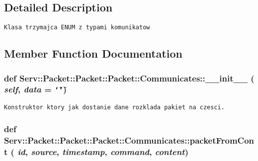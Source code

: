 \subsection{Detailed Description}


\footnotesize\begin{verbatim}Klasa trzymajca ENUM z typami komunikatow\end{verbatim}
\normalsize
 

\subsection{Member Function Documentation}
\hypertarget{class_serv_1_1_packet_1_1_packet_1_1_communicates_66ff7f1e5bb2594020af9e531007ce07}{
\subsubsection[{\_\-\_\-init\_\-\_\-}]{\setlength{\rightskip}{0pt plus 5cm}def Serv::Packet::Packet::Packet::Communicates::\_\-\_\-init\_\-\_\- ( {\em self}, \/   {\em data} = {\tt \char`\"{}\char`\"{}})}}
\label{class_serv_1_1_packet_1_1_packet_1_1_communicates_66ff7f1e5bb2594020af9e531007ce07}




\footnotesize\begin{verbatim}Konstruktor ktory jak dostanie dane rozklada pakiet na czesci.\end{verbatim}
\normalsize
 \hypertarget{class_serv_1_1_packet_1_1_packet_1_1_communicates_c2cd2b5c092a11d031baaa64ca9c17bb}{
\subsubsection[{packetFromCont}]{\setlength{\rightskip}{0pt plus 5cm}def Serv::Packet::Packet::Packet::Communicates::packetFromCont ( {\em id}, \/   {\em source}, \/   {\em timestamp}, \/   {\em command}, \/   {\em content})}}
\label{class_serv_1_1_packet_1_1_packet_1_1_communicates_c2cd2b5c092a11d031baaa64ca9c17bb}




